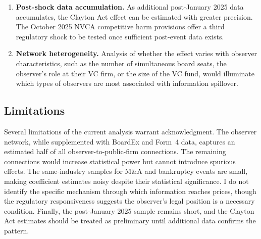 \begin{enumerate}
\item \textbf{Post-shock data accumulation.} As additional post-January 2025 data accumulates, the Clayton Act effect can be estimated with greater precision. The October 2025 NVCA competitive harm provisions offer a third regulatory shock to be tested once sufficient post-event data exists.

\item \textbf{Network heterogeneity.} Analysis of whether the effect varies with observer characteristics, such as the number of simultaneous board seats, the observer's role at their VC firm, or the size of the VC fund, would illuminate which types of observers are most associated with information spillover.
\end{enumerate}

\subsection{Limitations}

Several limitations of the current analysis warrant acknowledgment. The observer network, while supplemented with BoardEx and Form~4 data, captures an estimated half of all observer-to-public-firm connections. The remaining connections would increase statistical power but cannot introduce spurious effects. The same-industry samples for M\&A and bankruptcy events are small, making coefficient estimates noisy despite their statistical significance. I do not identify the specific mechanism through which information reaches prices, though the regulatory responsiveness suggests the observer's legal position is a necessary condition. Finally, the post-January 2025 sample remains short, and the Clayton Act estimates should be treated as preliminary until additional data confirms the pattern.